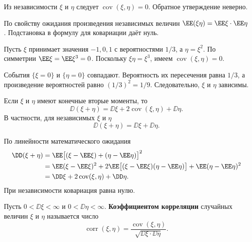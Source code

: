 \begin{theorem}
Из независимости $\xi$ и $\eta$ следует $\operatorname{cov}(\xi,\eta)=0$.
Обратное утверждение неверно.
\end{theorem}
\begin{Proof}
По свойству ожидания произведения независимых величин
$\EE(\xi\eta)=\EE\xi\cdot\EE\eta$. Подстановка в формулу для ковариации даёт нуль.
\end{Proof}
\begin{example}
Пусть $\xi$ принимает значения $-1,0,1$ с вероятностями $1/3$,
а $\eta=\xi^2$. По симметрии $\EE\xi=\EE\xi^3=0$.
Поскольку $\xi\eta=\xi^3$, имеем $\operatorname{cov}(\xi,\eta)=0$.

\smallskip
События $\{\xi=0\}$ и $\{\eta=0\}$ совпадают. Вероятность их пересечения
равна $1/3$, а произведение вероятностей равно $(1/3)^2=1/9$. Следовательно,
$\xi$ и $\eta$ зависимы.
\end{example}

\begin{theorem}
    Если $\xi$ и $\eta$ имеют конечные вторые моменты, то
    \[
        \DD(\xi+\eta)=\DD\xi+2\operatorname{cov}(\xi,\eta)+\DD\eta.
    \]
    В частности, для независимых $\xi$ и $\eta$
    \[
        \DD(\xi+\eta)=\DD\xi+\DD\eta.
    \]
\end{theorem}

\begin{Proof}
    По линейности математического ожидания
    \[
        \begin{aligned}
            \DD(\xi+\eta)
            &=\EE\bigl[(\xi-\EE\xi)+(\eta-\EE\eta)\bigr]^2\\
            &=\EE(\xi-\EE\xi)^2
              +2\EE\bigl[(\xi-\EE\xi)(\eta-\EE\eta)\bigr]
              +\EE(\eta-\EE\eta)^2\\
            &=\DD\xi+2\operatorname{cov}(\xi,\eta)+\DD\eta.
        \end{aligned}
    \]
    При независимости ковариация равна нулю.
\end{Proof}


\begin{definition}
    Пусть $0<\DD\xi<\infty$ и $0<\DD\eta<\infty$.
    \textbf{Коэффициентом корреляции} случайных величин $\xi$ и $\eta$
    называется число
    \[
        \operatorname{corr}(\xi,\eta)
        =\frac{\operatorname{cov}(\xi,\eta)}
        {\sqrt{\DD\xi\cdot\DD\eta}}.
    \]
\end{definition}

